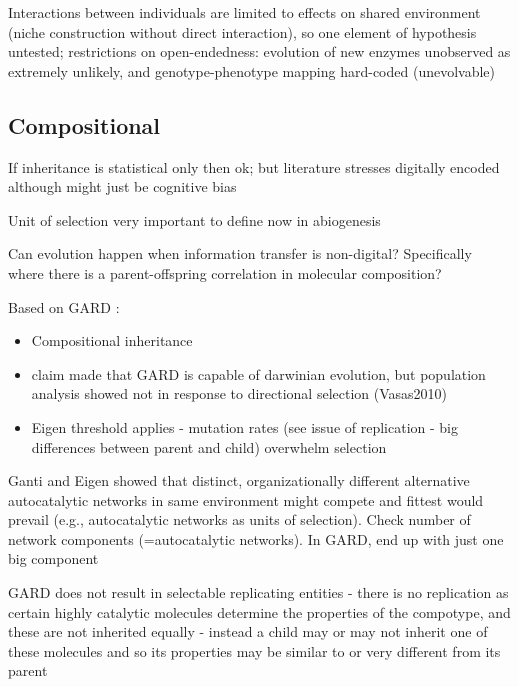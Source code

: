Interactions between individuals are limited to effects on shared environment (niche construction without direct interaction), so one element of hypothesis untested; restrictions on open-endedness: evolution of new enzymes unobserved as extremely unlikely, and genotype-phenotype mapping hard-coded (unevolvable)

\subsection{Compositional}

\autocite{Vasas2015, Vasas2012, Vasas2012a}

If inheritance is statistical only then ok; but literature stresses digitally encoded although might just be cognitive bias

Unit of selection very important to define now in abiogenesis

Can evolution happen when information transfer is non-digital? Specifically where there is a parent-offspring correlation in molecular composition?

Based on GARD \autocite{Segre1998}:

\begin{itemize}
	\item Compositional inheritance
	
	\item claim made that GARD is capable of darwinian evolution, but
	population analysis showed not in response to directional selection
	(Vasas2010)
	
	\item Eigen threshold applies - mutation rates (see issue of replication -
	big differences between parent and child) overwhelm selection
\end{itemize}

Ganti and Eigen showed that distinct, organizationally different alternative autocatalytic networks in same environment might compete and fittest would prevail (e.g., autocatalytic networks as units of selection).	Check number of network components (=autocatalytic networks). In GARD, end up with just one big component

GARD does not result in selectable replicating entities - there is no replication as certain highly catalytic molecules determine the properties of the compotype, and these are not inherited equally - instead a child may or may not inherit one of these molecules and so its properties may be similar to or very different from its parent

